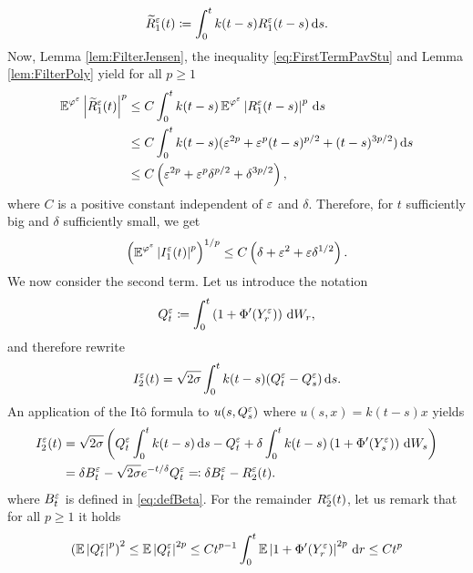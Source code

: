\documentclass[10pt]{article}
\begin{document}
\begin{appendices}
\begin{equation}
	\widetilde R_1^\varepsilon(t) \coloneqq \int_0^t k(t-s)R_1^\varepsilon(t-s) \,\mathrm{d} s.
	\end{equation}
	Now, Lemma \ref{lem:FilterJensen}, the inequality \eqref{eq:FirstTermPavStu} and Lemma \ref{lem:FilterPoly} yield for all $p \geq 1$
	\begin{equation}
	\begin{aligned}
		\operatorname{\mathbb{E}}^{\varphi^\varepsilon}\left\lvert\widetilde R_1^\varepsilon(t)\right\rvert^p &\leq C \int_0^t k(t-s)\operatorname{\mathbb{E}}^{\varphi^\varepsilon} \left\lvert R_1^\varepsilon(t-s)\right\rvert^p \,\mathrm{d} s\\
		&\leq C \int_0^t k(t-s)(\varepsilon^{2p} + \varepsilon^p(t-s)^{p/2}+(t-s)^{3p/2}) \,\mathrm{d} s\\
		&\leq C \left( \varepsilon^{2p} + \varepsilon^p \delta^{p/2} + \delta^{3p/2} \right),
	\end{aligned}
	\end{equation}
	where $C$ is a positive constant independent of $\varepsilon$ and $\delta$. Therefore, for $t$ sufficiently big and $\delta$ sufficiently small, we get
	\begin{equation}
		\left(\operatorname{\mathbb{E}}^{\varphi^\varepsilon}\left\lvert I_1^\varepsilon(t)\right\rvert^{p}\right)^{1/p} \leq C \left( \delta + \varepsilon^2 + \varepsilon \delta^{1/2} \right).
	\end{equation}
	We now consider the second term. Let us introduce the notation  
	\begin{equation}
		Q_t^\varepsilon \coloneqq \int_0^t \left(1 + \Phi'(Y_r^\varepsilon)\right) \,\mathrm{d} W_r,
	\end{equation}
	and therefore rewrite
	\begin{equation}
		I_2^\varepsilon(t) = \sqrt{2\sigma} \int_0^t k(t-s)(Q_t^\varepsilon - Q_s^\varepsilon) \,\mathrm{d} s.
	\end{equation}
	An application of the Itô formula to $u(s, Q_s^\varepsilon)$ where $u(s, x) = k(t-s)x$ yields
	\begin{equation}\label{eq:rewriteI2}
	\begin{aligned}
		I_2^\varepsilon(t) &= \sqrt{2\sigma} \left(Q_t^\varepsilon\int_0^t k(t-s) \,\mathrm{d} s - Q_t^\varepsilon + \delta \int_0^t k(t-s)\left(1 + \Phi'(Y_s^\varepsilon)\right) \,\mathrm{d} W_s\right)\\
		  			&= \delta B_t^\varepsilon - \sqrt{2\sigma} e^{-t/\delta} Q_t^\varepsilon \eqqcolon \delta B_t^\varepsilon - R_2^\varepsilon(t).
	\end{aligned}
	\end{equation}
	where $B_t^\varepsilon$ is defined in \eqref{eq:defBeta}. For the remainder $R_2^\varepsilon(t)$, let us remark that for all $p \geq 1$ it holds
	\begin{equation}\label{eq:BoundQ}
	\begin{aligned}
		\left(\E\abs{Q_t^\epl}^p\right)^2 \leq \E\abs{Q_t^\epl}^{2p} \leq Ct^{p-1}\int_0^t \E \abs{1 + \Phi'(Y_r^\epl)}^{2p} \dd r \leq C t^p

\end{aligned}
\end{equation}
\end{appendices}
\end{document}
